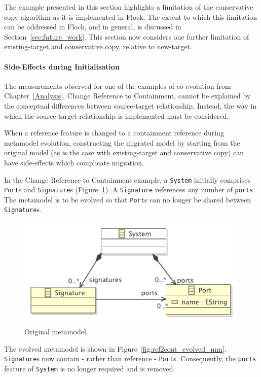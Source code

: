 The example presented in this section highlights a limitation of the conservative copy algorithm as it is implemented in Flock. The extent to which this limitation can be addressed in Flock, and in general, is discussed in Section~\ref{sec:future_work}. This section now considers one further limitation of existing-target and conservative copy, relative to new-target.

\paragraph{Side-Effects during Initialisation}
The measurements observed for one of the examples of co-evolution from Chapter~\ref{Analysis}, Change Reference to Containment, cannot be explained by the conceptual differences between source-target relationship. Instead, the way in which the source-target relationship is implemented must be considered.

When a reference feature is changed to a containment reference during metamodel evolution, constructing the migrated model by starting from the original model (as is the case with existing-target and conservative copy) can have side-effects which complicate migration.

In the Change Reference to Containment example, a \texttt{System} initially comprises \texttt{Port}s and \texttt{Signature}s (Figure~\ref{fig:ref2cont_original_mm}). A \texttt{Signature} references any number of \texttt{ports}. The metamodel is to be evolved so that \texttt{Port}s can no longer be shared between \texttt{Signature}s.

\begin{figure}[htbp]
  \centering
  \includegraphics[scale=0.75]{6.Evaluation/images/change_ref_to_cont_before.pdf}
  \caption{Original metamodel.}
  \label{fig:ref2cont_original_mm}
\end{figure}

The evolved metamodel is shown in Figure~\ref{fig:ref2cont_evolved_mm}. \texttt{Signature}s now contain - rather than reference - \texttt{Port}s. Consequently, the \texttt{ports} feature of \texttt{System} is no longer required and is removed.

